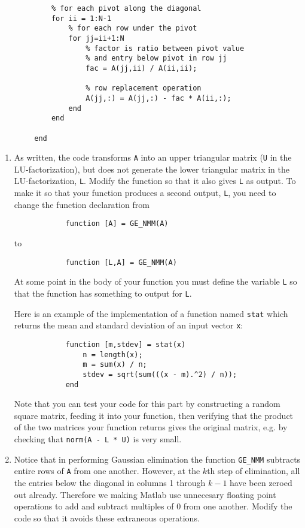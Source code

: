 \documentclass[]{article}
\begin{document}
\begin{enumerate}[resume]
\begin{verbatim}
			% for each pivot along the diagonal
			for ii = 1:N-1
			    % for each row under the pivot
			    for jj=ii+1:N
		            % factor is ratio between pivot value
		            % and entry below pivot in row jj
		            fac = A(jj,ii) / A(ii,ii);

		            % row replacement operation
		            A(jj,:) = A(jj,:) - fac * A(ii,:);
			    end
			end

		end
	\end{verbatim}

	\begin{enumerate}
		\item As written, the code transforms \texttt{A} into an upper triangular matrix (\texttt{U} in the LU-factorization), but does not generate the lower triangular matrix in the LU-factorization, \texttt{L}. Modify the function so that it also gives \texttt{L} as output. To make it so that your function produces a second output, \texttt{L}, you need to change the function declaration from 
		\begin{verbatim}
			function [A] = GE_NMM(A)
		\end{verbatim}
		to 
		\begin{verbatim}
			function [L,A] = GE_NMM(A)
		\end{verbatim}

		At some point in the body of your function you must define the variable \texttt{L} so that the function has something to output for \texttt{L}.

		Here is an example of the implementation of a function named \texttt{stat} which returns the mean and standard deviation of an input vector \texttt{x}:
		\begin{verbatim}
			function [m,stdev] = stat(x)
			    n = length(x);
			    m = sum(x) / n;
			    stdev = sqrt(sum(((x - m).^2) / n));
			end
		\end{verbatim}

		Note that you can test your code for this part by constructing a random square matrix, feeding it into your function, then verifying that the product of the two matrices your function returns gives the original matrix, e.g. by checking that \texttt{norm(A - L * U)} is very small.

		\item Notice that in performing Gaussian elimination the function \texttt{GE\_NMM} subtracts entire rows of \texttt{A} from one another. However, at the $k$th step of elimination, all the entries below the diagonal in columns 1 through $k-1$ have been zeroed out already. Therefore we making Matlab use unnecesary floating point operations to add and subtract multiples of 0 from one another. Modify the code so that it avoids these extraneous operations.


\end{enumerate}
\end{enumerate}
\end{document}
